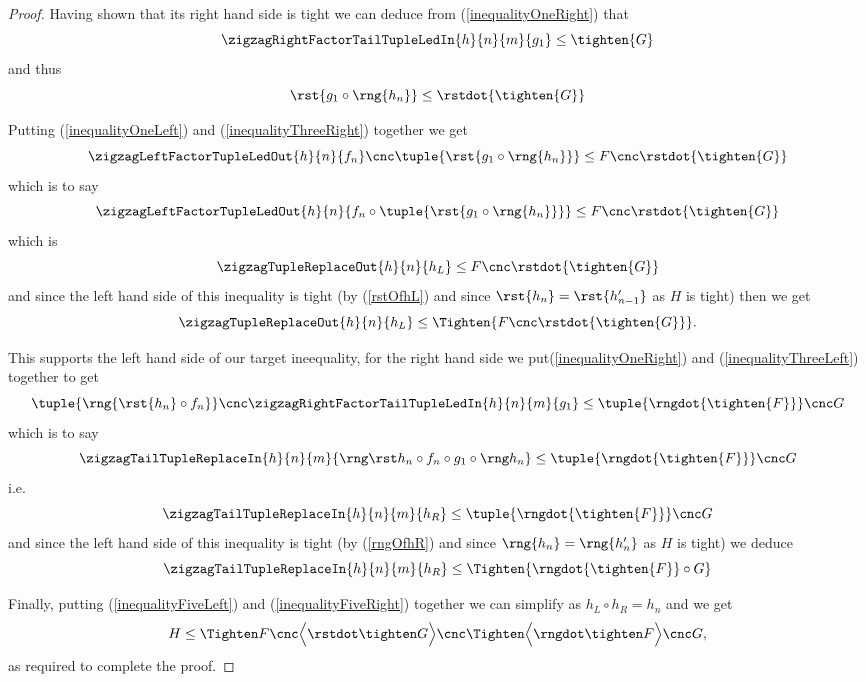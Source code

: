 {\begin{proof}
Having shown that its right hand side is tight
we can deduce from (\ref{inequalityOneRight}) that
\[
\zigzagRightFactorTailTupleLedIn{h}{n}{m}{g_1} \leq \tighten{G}
\]
and thus 
\begin{equation}
\label{inequalityThreeRight}
\rst{ g_1 \circ \rng{h_n}} \leq \rstdot{\tighten{G}}
\end{equation}

Putting (\ref{inequalityOneLeft})
 and (\ref{inequalityThreeRight}) together we get 
\[
\zigzagLeftFactorTupleLedOut{h}{n}{f_n} 
          \cnc \tuple{\rst{ g_1 \circ \rng{h_n}}}
              \leq F \cnc \rstdot{\tighten{G}}
\]
which is to say
\[
\zigzagLeftFactorTupleLedOut{h}{n}
        {f_n \circ \tuple{\rst{ g_1 \circ \rng{h_n}}}}
              \leq F \cnc \rstdot{\tighten{G}}
\]
which is 
\begin{equation}
\label{inequalityFourLeftRewrittenAgain}
\zigzagTupleReplaceOut{h}{n}
        {h_L}
              \leq F \cnc \rstdot{\tighten{G}}
\end{equation}
and since the left hand side of this inequality is tight
(by (\ref{rstOfhL}) and since $\rst{h_n} = \rst{h'_{n-1}}$
 as $H$ is tight)
then we get
\begin{equation}
\label{inequalityFiveLeft}
\zigzagTupleReplaceOut{h}{n}
        {h_L}
              \leq \Tighten{F \cnc \rstdot{\tighten{G}}}.
\end{equation}

This supports the left hand side of our target ineequality, for the right hand side we
put(\ref{inequalityOneRight}) 
and (\ref{inequalityThreeLeft}) together to get
\[
\tuple{\rng{\rst{h_n} \circ f_n}} \cnc \zigzagRightFactorTailTupleLedIn{h}{n}{m}{g_1} 
       \leq \tuple{\rngdot{\tighten{F}}} \cnc G
\]
which is to say
\[
\zigzagTailTupleReplaceIn{h}{n}{m}{\hR} 
       \leq \tuple{\rngdot{\tighten{F}}} \cnc G 
\]
i.e.
\[
\zigzagTailTupleReplaceIn{h}{n}{m}{h_R} 
        \leq  \tuple{\rngdot{\tighten{F}}} \cnc G 
\]
and since the left hand side of this inequality is tight
(by (\ref{rngOfhR}) and since $\rng{h_n} = \rng{h'_n}$
 as $H$ is tight)  we deduce
\begin{equation}
\label{inequalityFiveRight}
\zigzagTailTupleReplaceIn{h}{n}{m}
                {h_R} 
                 \leq  \Tighten{ \rngdot{\tighten{F}} \circ G}
\end{equation}

Finally, putting (\ref{inequalityFiveLeft}) 
and (\ref{inequalityFiveRight}) together
we can  simplify as  $h_L \circ h_R = h_n$ and we get 
\[
H \leq \theTightening,
\]
as required to complete the proof.
\end{proof}
 }%


